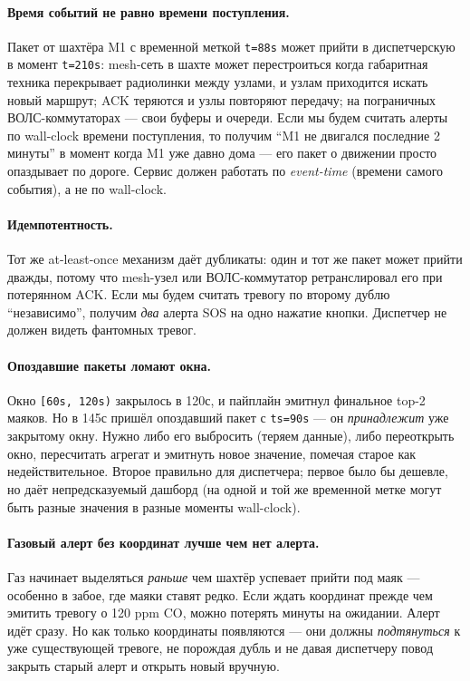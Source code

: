 \paragraph{Время событий не равно времени поступления.} Пакет от
шахтёра M1 с временной меткой \texttt{t=88s} может прийти в
диспетчерскую в момент \texttt{t=210s}: mesh-сеть в шахте
может перестроиться когда габаритная техника перекрывает
радиолинки между узлами, и узлам приходится искать новый
маршрут; ACK теряются и узлы повторяют передачу;
на пограничных ВОЛС-коммутаторах --- свои буферы и очереди.
Если мы будем считать алерты по wall-clock времени поступления, то
получим ``M1 не двигался последние 2 минуты'' в момент когда M1 уже
давно дома --- его пакет о движении просто опаздывает по дороге.
Сервис должен работать по \emph{event-time} (времени самого
события), а не по wall-clock.

\paragraph{Идемпотентность.} Тот же at-least-once механизм даёт
дубликаты: один и тот же пакет может прийти дважды, потому что
mesh-узел или ВОЛС-коммутатор ретранслировал его при потерянном
ACK. Если мы будем считать тревогу по второму дублю
``независимо'', получим \emph{два} алерта SOS на одно нажатие кнопки.
Диспетчер не должен видеть фантомных тревог.

\paragraph{Опоздавшие пакеты ломают окна.} Окно
\texttt{[60s, 120s)} закрылось в 120с, и пайплайн эмитнул финальное
top-2 маяков. Но в 145с пришёл опоздавший пакет с
\texttt{ts=90s} --- он \emph{принадлежит} уже закрытому окну. Нужно
либо его выбросить (теряем данные), либо переоткрыть окно, пересчитать
агрегат и эмитнуть новое значение, помечая старое как недействительное.
Второе правильно для диспетчера; первое было бы дешевле, но даёт
непредсказуемый дашборд (на одной и той же временной метке могут быть
разные значения в разные моменты wall-clock).

\paragraph{Газовый алерт без координат лучше чем нет алерта.}
Газ начинает выделяться \emph{раньше} чем шахтёр успевает прийти под
маяк --- особенно в забое, где маяки ставят редко. Если ждать
координат прежде чем эмитить тревогу о 120 ppm CO, можно
потерять минуты на ожидании. Алерт идёт сразу. Но как только
координаты появляются --- они должны \emph{подтянуться} к уже
существующей тревоге, не порождая дубль и не давая диспетчеру повод
закрыть старый алерт и открыть новый вручную.

